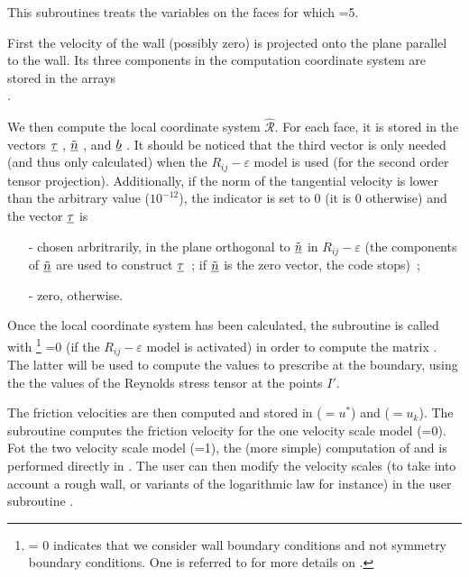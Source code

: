 This subroutines treats the variables  on the faces 
for which =5.

First the velocity of the wall (possibly zero) is projected onto 
the plane parallel to the wall. Its three components in the 
computation coordinate system are stored in the arrays 
\\  .

We then compute the local coordinate system  $\hat{\mathcal R}$.
For each face, it is stored in the vectors   $\underline{\tau}$ ,
 $\underline{\tilde{n}}$ , 
and $\underline{b}$ .
It should be noticed that the third vector is only needed (and thus
only calculated) when the  $R_{ij}-\varepsilon$ model is used (for the 
second order tensor projection). Additionally, if the norm of the tangential
velocity is lower than the arbitrary value 
($10^{-12}$), the indicator   is set to 0 (it is 0 otherwise)
and the vector  $\underline{\tau}$ is 
\begin{itemize}
\item [-] chosen arbritrarily, in the plane orthogonal to $\underline{\tilde{n}}$ in
$R_{ij}-\varepsilon$  (the components of $\underline{\tilde{n}}$ are used
to construct  $\underline{\tau}$~; if  $\underline{\tilde{n}}$ is the zero vector,
 the code stops)~;
\item [-] zero, otherwise.
\end{itemize}

Once the local coordinate system has been calculated, 
the subroutine  is called with 
\footnote{ = 0 indicates that we consider wall boundary conditions 
and not symmetry boundary conditions. One is referred to  for 
more details on  .}  =0
(if the $R_{ij}-\varepsilon$  model is activated) in order to compute
the matrix . The latter will be used to compute the values to 
prescribe at the boundary, using the the values of the Reynolds stress
tensor at the points $I'$.

The friction velocities are then computed and stored in
 ($=u^*$) and  ($=u_k$). The subroutine 
 computes the friction velocity for the one velocity scale model 
(=0). Fot the two velocity scale model (=1), 
the (more simple) computation of  and  is performed 
directly in  . The user can then modify the velocity scales 
(to take into account a rough wall, or variants of the logarithmic law
for instance) in the user subroutine  .

